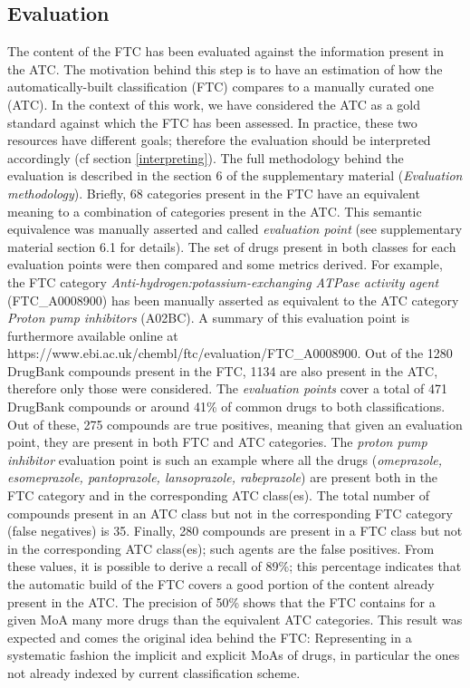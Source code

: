 \documentclass{bioinfo}
\begin{document}
\subsection{Evaluation}
The content of the FTC has been evaluated against the information present in the ATC. The motivation behind 
this step is to have an estimation of how the automatically-built classification (FTC) compares to a manually curated 
one (ATC). In the context of this work, we have considered the ATC as a gold standard against which the FTC 
has been assessed. In practice, these two resources have different goals; therefore the evaluation should be 
interpreted accordingly (cf section \ref{interpreting}). The full methodology behind the evaluation is 
described in the section 6 of the supplementary material (\emph{Evaluation methodology}). 
Briefly, 68 categories present in the FTC have an equivalent meaning to a combination of categories present in the ATC. 
This semantic equivalence was manually asserted 
and called \emph{evaluation point} (see supplementary material section 6.1 for details). 
The set of drugs present in both classes for each evaluation points were then compared and some metrics derived. 
For example, the FTC category \emph{Anti-hydrogen:potassium-exchanging ATPase activity agent} (FTC\_A0008900) has 
been manually asserted as equivalent to the ATC category \emph{Proton pump inhibitors} (A02BC). A summary of this 
evaluation point is furthermore available online at {{https://www.ebi.ac.uk/chembl/ftc/evaluation/FTC\_A0008900}}.
Out of the 1280 DrugBank compounds present in the FTC, 1134 are also present in the ATC, therefore only those were 
considered. The \emph{evaluation points} cover a total of 471 DrugBank compounds or around 41\% of common drugs to both classifications.
Out of these, 275 compounds are true positives, 
meaning that given an evaluation point, they are present in both FTC and ATC categories. The \emph{proton pump inhibitor} 
evaluation point is such an example where all the drugs (\emph{omeprazole, esomeprazole, pantoprazole, lansoprazole, rabeprazole}) are 
present both in the FTC category and in the corresponding ATC class(es). The total number of compounds present in an ATC class but 
not in the corresponding FTC category (false negatives) is 35. Finally, 280 compounds are present in a FTC class but not in the 
corresponding ATC class(es); such agents are the false positives. From these values, it is possible to derive a 
recall of 89\%; this percentage indicates that the automatic build of the FTC covers a good portion of the content 
already present in the ATC. The precision of 50\% shows that the FTC contains for a given MoA many more drugs than the 
equivalent ATC categories. This result was expected and comes the original idea behind the FTC: Representing in a systematic fashion
the implicit and explicit MoAs of drugs, in particular the ones not already indexed by current classification scheme.
\end{document}
